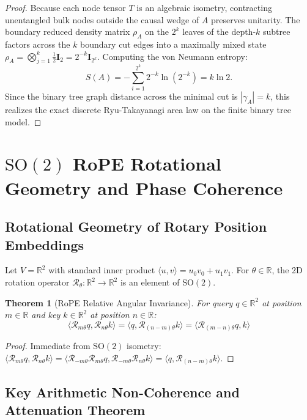 \documentclass[11pt,reqno]{article}
\theoremstyle{plain}
\newtheorem{theorem}{Theorem}[section]
\theoremstyle{definition}
\theoremstyle{remark}
\newcommand{\R}{\mathbb{R}}
\begin{document}
\begin{proof}
Because each node tensor $T$ is an algebraic isometry, contracting unentangled bulk nodes outside the causal wedge of $A$ preserves unitarity. The boundary reduced density matrix $\rho_A$ on the $2^k$ leaves of the depth-$k$ subtree factors across the $k$ boundary cut edges into a maximally mixed state $\rho_A = \bigotimes_{j=1}^k \frac{1}{2} \mathbf{I}_2 = 2^{-k} \mathbf{I}_{2^k}$. Computing the von Neumann entropy:
\[
S(A) = -\sum_{i=1}^{2^k} 2^{-k} \ln(2^{-k}) = k \ln 2.
\]
Since the binary tree graph distance across the minimal cut is $|\gamma_A| = k$, this realizes the exact discrete Ryu-Takayanagi area law on the finite binary tree model.
\end{proof}

\section{$\mathrm{SO}(2)$ RoPE Rotational Geometry and Phase Coherence}

\subsection{Rotational Geometry of Rotary Position Embeddings}

Let $V = \R^2$ with standard inner product $\langle u, v \rangle = u_0 v_0 + u_1 v_1$. For $\theta \in \R$, the 2D rotation operator $\mathcal{R}_\theta \colon \R^2 \to \R^2$ is an element of $\mathrm{SO}(2)$.

\begin{theorem}[RoPE Relative Angular Invariance]
\label{thm:rope_invariance}
For query $q \in \R^2$ at position $m \in \R$ and key $k \in \R^2$ at position $n \in \R$:
\[
\langle \mathcal{R}_{m\theta} q, \mathcal{R}_{n\theta} k \rangle = \langle q, \mathcal{R}_{(n - m)\theta} k \rangle = \langle \mathcal{R}_{(m - n)\theta} q, k \rangle
\]
\end{theorem}

\begin{proof}
Immediate from $\mathrm{SO}(2)$ isometry: $\langle \mathcal{R}_{m\theta} q, \mathcal{R}_{n\theta} k \rangle = \langle \mathcal{R}_{-m\theta} \mathcal{R}_{m\theta} q, \mathcal{R}_{-m\theta} \mathcal{R}_{n\theta} k \rangle = \langle q, \mathcal{R}_{(n - m)\theta} k \rangle$.
\end{proof}

\subsection{Key Arithmetic Non-Coherence and Attenuation Theorem}
\end{document}
